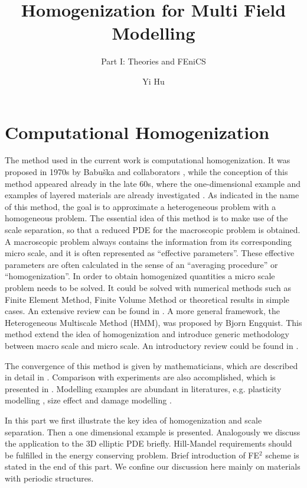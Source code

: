 \documentclass[10pt,a4paper]{scrreprt}
\author{Yi Hu}
\title{Homogenization for Multi Field Modelling}
\subtitle{Part I: Theories and FEniCS}
\begin{document}
\chapter{Computational Homogenization}
The method used in the current work is computational homogenization. It was proposed in 1970s by Babu\v{s}ka and collaborators \citep{EPFL-ARTICLE-184958}, while the conception of this method appeared already in the late 60s, where the one-dimensional example and examples of layered materials are already investigated \citep{cioranescu_introduction_2000}. As indicated in the name of this method, the goal is to approximate a heterogeneous problem with a homogeneous problem. The essential idea of this method is to make use of the scale separation, so that a reduced PDE for the macroscopic problem is obtained. A macroscopic problem always contains the information from its corresponding micro scale, and it is often represented as ``effective parameters''. These effective parameters are often calculated in the sense of an ``averaging procedure'' or ``homogenization''. In order to obtain homogenized quantities a micro scale problem needs to be solved. It could be solved with numerical methods such as Finite Element Method, Finite Volume Method or theoretical results in simple cases. An extensive review  can be found in \citep{efendiev2009multiscale}. A more general framework, the Heterogeneous Multiscale Method (HMM), was proposed by Bjorn Engquist. This method extend the idea of homogenization and introduce generic methodology between macro scale and micro scale. An introductory review could be found in \citep{weinan2007heterogeneous}.

The convergence of this method is given by mathematicians, which are described in detail in \citep{cioranescu_introduction_2000}. Comparison with experiments are also accomplished, which is presented in \citep{jansson_materials_1990}. Modelling examples are abundant in literatures, e.g. plasticity modelling \citep{miehe_computational_1999}, size effect and damage modelling \citep{dascalu_damage_2008}.

In this part we first illustrate the key idea of homogenization and scale separation. Then a one dimensional example is presented. Analogously we discuss the application to the 3D elliptic PDE briefly. Hill-Mandel requirements should be fulfilled in the energy conserving problem. Brief introduction of FE$^{2}$ scheme is stated in the end of this part. We confine our discussion here mainly on materials with periodic structures. 
\end{document}
